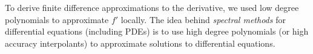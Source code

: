 \documentclass[12pt,a4paper]{article}
\begin{document}
To derive finite difference approximations to the derivative, we used low degree polynomials to approximate $f'$ locally.  The idea behind \emph{spectral methods} for differential equations (including PDEs) is to use high degree polynomials (or high accuracy interpolants) to approximate solutions to differential equations.
\end{document}
